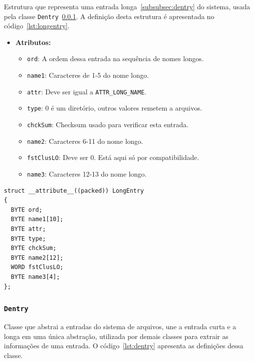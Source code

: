\documentclass[
    12pt,				%
    oneside,   	        %
    a4paper,			%
    english,			%
    french,				%
    spanish,			%
    brazil,				%
    ]{pacotes/abntex2}
\begin{document}
Estrutura que representa uma entrada longa~\ref{subsubsec:dentry} do sistema, usada pela classe \texttt{Dentry}~\ref{subsubsec:dentry_code}. A definição desta estrutura é apresentada no código~\ref{lst:longentry}.

\begin{itemize}
    \item \textbf{Atributos:}
        \begin{itemize}
            \item \texttt{ord}: A ordem dessa entrada na sequência de nomes longos.
            \item \texttt{name1}: Caracteres de 1-5 do nome longo.
            \item \texttt{attr}: Deve ser igual a \texttt{ATTR\_LONG\_NAME}.
            \item \texttt{type}: 0 é um diretório, outros valores remetem a arquivos.
            \item \texttt{chckSum}: Checksum usado para verificar esta entrada.
            \item \texttt{name2}: Caracteres 6-11 do nome longo.
            \item \texttt{fstClusLO}: Deve ser 0. Está aqui só por compatibilidade.
            \item \texttt{name3}: Caracteres 12-13 do nome longo.
        \end{itemize}
\end{itemize}


\begin{lstlisting}[caption={Estrutura que representa uma entrada longa no sistema de arquivos}, label={lst:longentry}] 
struct __attribute__((packed)) LongEntry
{
  BYTE ord;
  BYTE name1[10];
  BYTE attr; 
  BYTE type; 
  BYTE chckSum; 
  BYTE name2[12];
  WORD fstClusLO; 
  BYTE name3[4]; 
};
\end{lstlisting}

\subsubsection{\texttt{Dentry}}
\label{subsubsec:dentry_code}

Classe que abstrai a entradas do sistema de arquivos, une a entrada curta e a longa em uma única abstração, utilizada por demais classes para extrair as informações de uma entrada. O código~\ref{lst:dentry} apresenta as definições dessa classe. 
\end{document}
